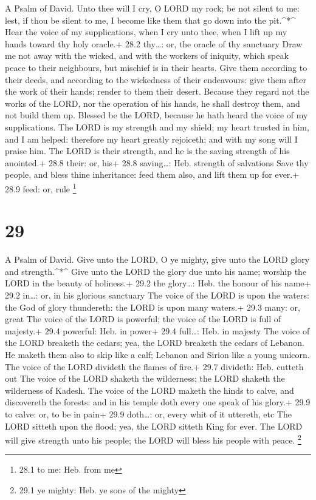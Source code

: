A Psalm of David.  Unto thee will I cry, O LORD my rock; be
not silent to me: lest, if thou be silent to me, I become like them that
go down into the pit.\^{}*\^{}  Hear the voice of my
supplications, when I cry unto thee, when I lift up my hands toward thy
holy oracle.+ 28.2 thy\ldots: or, the oracle of thy sanctuary
 Draw me not away with the wicked, and with the workers of
iniquity, which speak peace to their neighbours, but mischief is in
their hearts.  Give them according to their deeds, and
according to the wickedness of their endeavours: give them after the
work of their hands; render to them their desert.  Because
they regard not the works of the LORD, nor the operation of his hands,
he shall destroy them, and not build them up.  Blessed be
the LORD, because he hath heard the voice of my supplications.
 The LORD is my strength and my shield; my heart trusted in
him, and I am helped: therefore my heart greatly rejoiceth; and with my
song will I praise him.  The LORD is their strength, and he
is the saving strength of his anointed.+ 28.8 their: or, his+ 28.8
saving\ldots: Heb. strength of salvations  Save thy people,
and bless thine inheritance: feed them also, and lift them up for ever.+
28.9 feed: or, rule \footnote{28.1 to me: Heb. from me}

\hypertarget{section-28}{%
\section{29}\label{section-28}}

A Psalm of David.  Give unto the LORD, O ye mighty, give
unto the LORD glory and strength.\^{}*\^{}  Give unto the
LORD the glory due unto his name; worship the LORD in the beauty of
holiness.+ 29.2 the glory\ldots: Heb. the honour of his name+ 29.2
in\ldots: or, in his glorious sanctuary  The voice of the
LORD is upon the waters: the God of glory thundereth: the LORD is upon
many waters.+ 29.3 many: or, great  The voice of the LORD is
powerful; the voice of the LORD is full of majesty.+ 29.4 powerful: Heb.
in power+ 29.4 full\ldots: Heb. in majesty  The voice of the
LORD breaketh the cedars; yea, the LORD breaketh the cedars of Lebanon.
 He maketh them also to skip like a calf; Lebanon and Sirion
like a young unicorn.  The voice of the LORD divideth the
flames of fire.+ 29.7 divideth: Heb. cutteth out  The voice
of the LORD shaketh the wilderness; the LORD shaketh the wilderness of
Kadesh.  The voice of the LORD maketh the hinds to calve,
and discovereth the forests: and in his temple doth every one speak of
his glory.+ 29.9 to calve: or, to be in pain+ 29.9 doth\ldots: or, every
whit of it uttereth, etc  The LORD sitteth upon the flood;
yea, the LORD sitteth King for ever.  The LORD will give
strength unto his people; the LORD will bless his people with peace.
\footnote{29.1 ye mighty: Heb. ye sons of the mighty}

